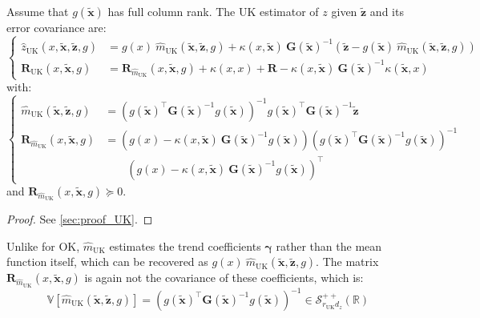 \begin{proposition}\label{th:universal_kriging}
	Assume that $g(\tilde{\mathbf{x}})$ has full column rank. The UK estimator of $z$ given $\tilde{\mathbf{z}}$ and its error covariance are:
	\begin{equation}
		\left\{\begin{aligned}
		\hat{z}_{\mathrm{UK}}(x,\tilde{\mathbf{x}},\tilde{\mathbf{z}},g)&=g(x)\:\hat{m}_{\mathrm{UK}}(\tilde{\mathbf{x}},\tilde{\mathbf{z}},g)+\kappa(x,\tilde{\mathbf{x}})\:\mathbf{G}(\tilde{\mathbf{x}})^{-1}\left(\tilde{\mathbf{z}}-g(\tilde{\mathbf{x}})\:\hat{m}_{\mathrm{UK}}(\tilde{\mathbf{x}},\tilde{\mathbf{z}},g)\right)\\
		\mathbf{R}_{\mathrm{UK}}(x,\tilde{\mathbf{x}},g)&=\mathbf{R}_{\hat{m}_{\mathrm{UK}}}(x,\tilde{\mathbf{x}},g)+\kappa(x,x)+\mathbf{R}-\kappa(x,\tilde{\mathbf{x}})\:\mathbf{G}(\tilde{\mathbf{x}})^{-1}\kappa\left(\tilde{\mathbf{x}},x\right)
		\end{aligned}\right.\label{eq:universal_kriging_equations}
	\end{equation}
	with:
	\begin{equation}
		\left\{\begin{aligned}
		\hat{m}_{\mathrm{UK}}(\tilde{\mathbf{x}},\tilde{\mathbf{z}},g)&=\left(g(\tilde{\mathbf{x}})^\top \mathbf{G}(\tilde{\mathbf{x}})^{-1}g(\tilde{\mathbf{x}})\right)^{-1}g(\tilde{\mathbf{x}})^\top \mathbf{G}(\tilde{\mathbf{x}})^{-1}\tilde{\mathbf{z}}\\
		\mathbf{R}_{\hat{m}_{\mathrm{UK}}}(x,\tilde{\mathbf{x}},g)&=\left(g(x)-\kappa(x,\tilde{\mathbf{x}})\:\mathbf{G}(\tilde{\mathbf{x}})^{-1}g(\tilde{\mathbf{x}})\right)\left(g(\tilde{\mathbf{x}})^\top \mathbf{G}(\tilde{\mathbf{x}})^{-1}g(\tilde{\mathbf{x}})\right)^{-1}\\
		&\qquad\left(g(x)-\kappa(x,\tilde{\mathbf{x}})\:\mathbf{G}(\tilde{\mathbf{x}})^{-1}g(\tilde{\mathbf{x}})\right)^\top
		\end{aligned}\right.\label{eq:kriged_universal_mean}
	\end{equation}
	and $\mathbf{R}_{\hat{m}_{\mathrm{UK}}}(x,\tilde{\mathbf{x}},g)\succeq0$.
\end{proposition}

\begin{proof}
	See \cref{sec:proof_UK}.
\end{proof}

Unlike for OK, $\hat{m}_{\mathrm{UK}}$ estimates the trend coefficients $\boldsymbol{\gamma}$ rather than the mean function itself, which can be recovered as $g(x)\:\hat{m}_{\mathrm{UK}}(\tilde{\mathbf{x}},\tilde{\mathbf{z}},g)$.  The matrix $\mathbf{R}_{\hat{m}_{\mathrm{UK}}}(x,\tilde{\mathbf{x}},g)$ is again not the covariance of these coefficients, which is:
\begin{equation}
	\mathbb{V}\left[\hat{m}_{\mathrm{UK}}(\tilde{\mathbf{x}},\tilde{\mathbf{z}},g)\right]=\left(g(\tilde{\mathbf{x}})^\top \mathbf{G}(\tilde{\mathbf{x}})^{-1}g(\tilde{\mathbf{x}})\right)^{-1}\in\mathcal{S}_{r_{\mathrm{UK}}d_z}^{++}(\mathbb{R})
\end{equation}

